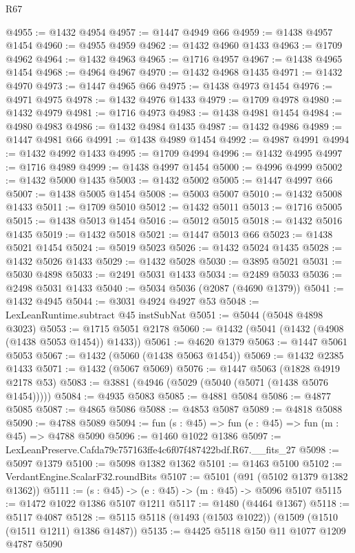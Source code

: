 \begin{lexlean}{R67}
\begin{coremodule}
@4955 := @1432 @4954
@4957 := @1447 @4949 @66
@4959 := @1438 @4957 @1454
@4960 := @4955 @4959
@4962 := @1432 @4960 @1433
@4963 := @1709 @4962
@4964 := @1432 @4963
@4965 := @1716 @4957
@4967 := @1438 @4965 @1454
@4968 := @4964 @4967
@4970 := @1432 @4968 @1435
@4971 := @1432 @4970
@4973 := @1447 @4965 @66
@4975 := @1438 @4973 @1454
@4976 := @4971 @4975
@4978 := @1432 @4976 @1433
@4979 := @1709 @4978
@4980 := @1432 @4979
@4981 := @1716 @4973
@4983 := @1438 @4981 @1454
@4984 := @4980 @4983
@4986 := @1432 @4984 @1435
@4987 := @1432 @4986
@4989 := @1447 @4981 @66
@4991 := @1438 @4989 @1454
@4992 := @4987 @4991
@4994 := @1432 @4992 @1433
@4995 := @1709 @4994
@4996 := @1432 @4995
@4997 := @1716 @4989
@4999 := @1438 @4997 @1454
@5000 := @4996 @4999
@5002 := @1432 @5000 @1435
@5003 := @1432 @5002
@5005 := @1447 @4997 @66
@5007 := @1438 @5005 @1454
@5008 := @5003 @5007
@5010 := @1432 @5008 @1433
@5011 := @1709 @5010
@5012 := @1432 @5011
@5013 := @1716 @5005
@5015 := @1438 @5013 @1454
@5016 := @5012 @5015
@5018 := @1432 @5016 @1435
@5019 := @1432 @5018
@5021 := @1447 @5013 @66
@5023 := @1438 @5021 @1454
@5024 := @5019 @5023
@5026 := @1432 @5024 @1435
@5028 := @1432 @5026 @1433
@5029 := @1432 @5028
@5030 := @3895 @5021
@5031 := @5030 @4898
@5033 := @2491 @5031 @1433
@5034 := @2489 @5033
@5036 := @2498 @5031 @1433
@5040 := @5034 @5036 (@2087 (@4690 @1379))
@5041 := @1432 @4945
@5044 := @3031 @4924 @4927 @53
@5048 := LexLeanRuntime.subtract @45 instSubNat
@5051 := @5044 (@5048 @4898 @3023)
@5053 := @1715 @5051 @2178
@5060 := @1432 (@5041 (@1432 (@4908 (@1438 @5053 @1454)) @1433))
@5061 := @4620 @1379
@5063 := @1447 @5061 @5053
@5067 := @1432 (@5060 (@1438 @5063 @1454))
@5069 := @1432 @2385 @1433
@5071 := @1432 (@5067 @5069)
@5076 := @1447 @5063 (@1828 @4919 @2178 @53)
@5083 := @3881 (@4946 (@5029 (@5040 (@5071 (@1438 @5076 @1454)))))
@5084 := @4935 @5083
@5085 := @4881 @5084
@5086 := @4877 @5085
@5087 := @4865 @5086
@5088 := @4853 @5087
@5089 := @4818 @5088
@5090 := @4788 @5089
@5094 := fun (s : @45) => fun (e : @45) => fun (m : @45) => @4788 @5090
@5096 := @1460 @1022 @1386
@5097 := LexLeanPreserve.Cafda79c757163ffe4c6f07f487422bdf.R67.__fits_27
@5098 := @5097 @1379
@5100 := @5098 @1382 @1362
@5101 := @1463 @5100
@5102 := VerdantEngine.ScalarF32.roundBits
@5107 := @5101 (@91 (@5102 @1379 @1382 @1362))
@5111 := (s : @45) -> (e : @45) -> (m : @45) -> @5096 @5107
@5115 := @1472 @1022 @1386 @5107 @1211
@5117 := @1480 (@4464 @1367)
@5118 := @5117 @4087
@5128 := @5115 @5118 (@1493 (@1503 @1022)) (@1509 (@1510 (@1511 @1211) @1386 @1487))
@5135 := @4425 @5118 @150 @11 @1077 @1209 @4787 @5090

\end{coremodule}
\end{lexlean}
